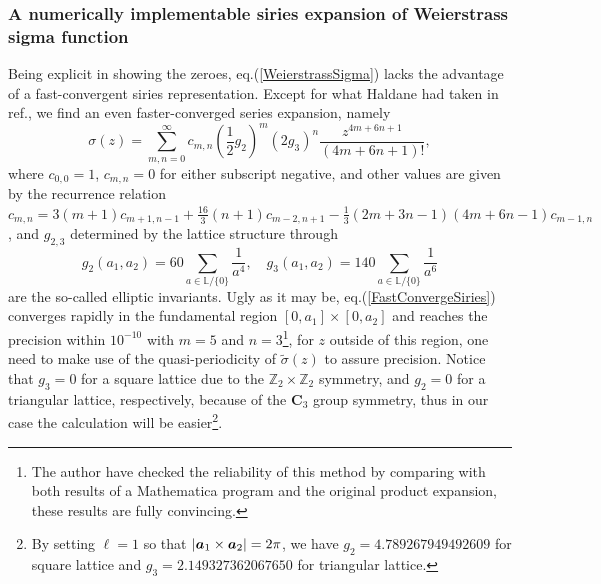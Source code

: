 \documentclass[%
nofootinbib,
 amsmath,amssymb,
 aps,onecolumn,
prb
]{revtex4-2}
\newcommand{\tilsig}{\tilde{\sigma}}
\begin{document}
\subsubsection{A numerically implementable siries expansion of Weierstrass sigma function}
Being explicit in showing the zeroes, eq.(\ref{WeierstrassSigma}) lacks the advantage of a fast-convergent siries representation. Except for what Haldane had taken in ref.\cite{HaldaneWeierstrass1}, we find an even faster-converged
series expansion, namely\cite{abramowitz1970handbook}
\begin{equation}\label{FastConvergeSiries}
    \sigma(z)=\sum_{m,n=0}^{\infty}c_{m,n}(\frac{1}{2}g_2)^m(2g_3)^n\frac{z^{4m+6n+1}}{(4m+6n+1)!},
\end{equation}
where $c_{0,0}=1$, $c_{m,n}=0$ for either subscript negative, and other values are given by the recurrence relation $c_{m,n}=3(m+1)c_{m+1,n-1}+\frac{16}{3}(n+1)c_{m-2,n+1}
-\frac{1}{3}(2m+3n-1)(4m+6n-1)c_{m-1,n}$, and $g_{2,3}$ determined by the lattice structure through
\begin{equation}
g_2(a_1,a_2)= 60\sum_{a\in\mathbb{L}/\{0\}}\frac{1}{a^4},\quad g_3(a_1,a_2)= 140\sum_{a\in\mathbb{L}/\{0\}}\frac{1}{a^6}
\end{equation}
are the so-called elliptic invariants. Ugly as it may be, eq.(\ref{FastConvergeSiries}) converges rapidly in the fundamental region $[0,a_1]\times[0,a_2]$ and reaches the precision within $10^{-10}$ with $m=5$ and $n=3$\footnote{The author have checked the reliability of this method
by comparing with both results of a Mathematica program and the original product expansion, these results are fully convincing.}, for $z$ outside of this region, one need to make use of the quasi-periodicity of $\tilsig(z)$ to assure precision. Notice that $g_3=0$ for a square lattice due to the $\mathbb{Z}_2\times\mathbb{Z}_2$ symmetry, and $g_2=0$ for a triangular lattice, respectively,
because of the $\mathbf{C}_3$ group symmetry, thus in our case the calculation will be easier\footnote{By setting $\ell=1$ so that $|\vb*{a}_1\times\vb*{a}_2|=2\pi$, we have $g_2=4.789267949492609$ for square lattice and $g_3=2.149327362067650$ for triangular lattice.}.
\end{document}
